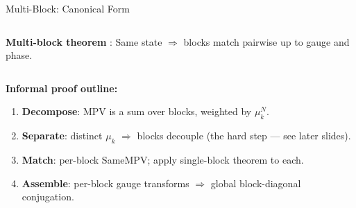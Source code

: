 \documentclass[aspectratio=169,10pt]{beamer}
\begin{document}
\begin{frame}{Multi-Block: Canonical Form}
\begin{columns}[T]
        \vspace{0.3em}
        \textbf{Multi-block theorem} \cite{Cirac2017Annals} \cite{Cirac2017Irreducible}:
        Same state $\Rightarrow$ blocks match pairwise up to gauge and phase.
    \end{columns}

    \vspace{0.4em}
    {\small\textbf{Informal proof outline:}}
    \begin{enumerate}\itemsep0.1em
        \item {\small \textbf{Decompose}: MPV is a sum over blocks, weighted by $\mu_k^N$.}
        \item {\small \textbf{Separate}: distinct $\mu_k$ $\Rightarrow$ blocks decouple (the hard step --- see later slides).}
        \item {\small \textbf{Match}: per-block SameMPV; apply single-block theorem to each.}
        \item {\small \textbf{Assemble}: per-block gauge transforms $\Rightarrow$ global block-diagonal conjugation.}
    \end{enumerate}
\end{frame}
\end{document}
